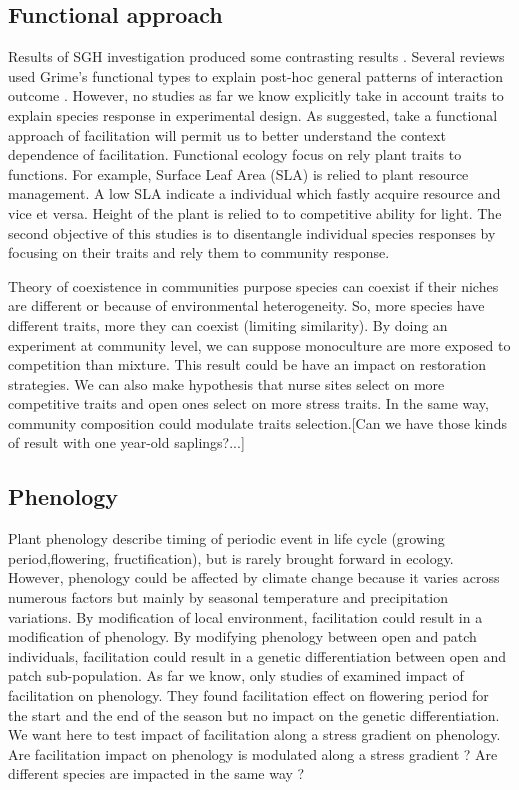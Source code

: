 \documentclass[12pt]{article} %
\begin{document}
\subsection{Functional approach}
Results of SGH investigation produced some contrasting results \citep{Maestre2009}. Several reviews used Grime's functional types to explain post-hoc general patterns of interaction outcome \citep{Maestre2009,Butterfield2013}. %
However, no studies as far we know explicitly take in account traits to explain species response in experimental design. As \citet{Butterfield2013} suggested, take a functional approach of facilitation will permit us to better understand the context dependence of facilitation. Functional ecology focus on rely plant traits to functions. For example, Surface Leaf Area (SLA) is relied to plant resource management. A low SLA indicate a individual which fastly acquire resource and vice et versa. Height of the plant is relied to to competitive ability for light. The second objective of this studies is to disentangle individual species responses by focusing on their traits and rely them to community response. 

Theory of coexistence in communities purpose species can coexist if their niches are different or because of environmental heterogeneity. So, more species have different traits, more they can coexist (limiting similarity). By doing an experiment at community level, we can suppose monoculture are more exposed to competition than mixture. This result could be have an impact on restoration strategies. We can also make hypothesis that nurse sites select on more competitive traits and open ones select on more stress traits. In the same way, community composition could modulate traits selection.[Can we have those kinds of result with one year-old saplings?...]

\subsection{Phenology}
Plant phenology describe timing of periodic event in life cycle (growing period,flowering, fructification), but is rarely brought forward in ecology.
However, phenology could be affected by climate change \citep{Cleland2007} because it varies across numerous factors but mainly by seasonal temperature and precipitation variations. By modification of local environment, facilitation could result in a modification of phenology. By modifying phenology between open and patch individuals, facilitation could result in a genetic differentiation between open and patch sub-population. As far we know, only studies of \citet{Castellanos2014} examined impact of facilitation on phenology. They found facilitation effect on flowering period for the start and the end of the season but no impact on the genetic differentiation. We want here to test impact of facilitation along a stress gradient on phenology. Are facilitation impact on phenology is modulated along a stress gradient ? Are different species are impacted in the same way ?
\end{document}
